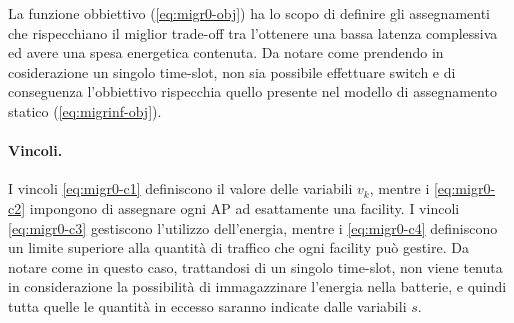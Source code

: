 La funzione obbiettivo (\ref{eq:migr0-obj}) ha lo scopo di definire gli assegnamenti che rispecchiano il miglior trade-off tra l'ottenere una bassa latenza complessiva ed avere una spesa energetica contenuta. Da notare come prendendo in cosiderazione un singolo time-slot, non sia possibile effettuare switch e di conseguenza l'obbiettivo rispecchia quello presente nel modello di assegnamento statico (\ref{eq:migrinf-obj}).

\paragraph*{Vincoli.}

I vincoli \ref{eq:migr0-c1} definiscono il valore delle variabili $v_k$, mentre i \ref{eq:migr0-c2} impongono di assegnare ogni AP ad esattamente una facility. I vincoli \ref{eq:migr0-c3} gestiscono l'utilizzo dell'energia, mentre i \ref{eq:migr0-c4} definiscono un limite superiore alla quantità di traffico che ogni facility può gestire. Da notare come in questo caso, trattandosi di un singolo time-slot, non viene tenuta in considerazione la possibilità di immagazzinare l'energia nella batterie, e quindi tutta quelle le quantità in eccesso saranno indicate dalle variabili $s$.
